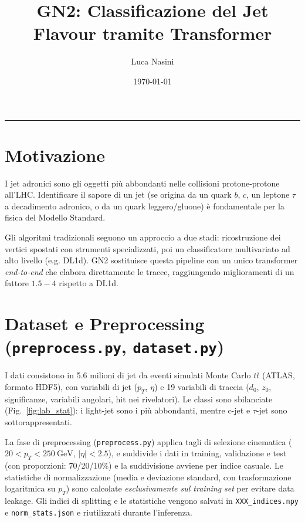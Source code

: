 \documentclass[11pt,a4paper]{article}
\title{\vspace{-1cm}GN2: Classificazione del Jet Flavour tramite Transformer}
\date{\today}
\author{Luca Nasini}
\begin{document}
\maketitle
\vspace{-6pt}
\hrule
\vspace{6pt}


\section{Motivazione}

I jet adronici sono gli oggetti più abbondanti nelle collisioni protone-protone all'LHC.
Identificare il sapore di un jet (se origina da un quark $b$, $c$, un leptone $\tau$ a decadimento adronico, o da un quark leggero/gluone) è fondamentale per la fisica del Modello Standard.

Gli algoritmi tradizionali seguono un approccio a due stadi: ricostruzione dei vertici spostati con strumenti specializzati, poi un classificatore multivariato ad alto livello (e.g. DL1d).
GN2 sostituisce questa pipeline con un unico transformer \textit{end-to-end} che elabora direttamente le tracce, raggiungendo miglioramenti di un fattore $1.5-4$ rispetto a DL1d.

\section{Dataset e Preprocessing (\texttt{preprocess.py}, \texttt{dataset.py})}

I dati consistono in 5.6 milioni di jet da eventi simulati Monte Carlo $t\bar{t}$ (ATLAS, formato HDF5), con variabili di jet ($p_T$, $\eta$) e 19 variabili di traccia ($d_0$, $z_0$, significanze, variabili angolari, hit nei rivelatori).
Le classi sono sbilanciate (Fig.~\ref{fig:lab_stat}): i light-jet sono i più abbondanti, mentre c-jet e $\tau$-jet sono sottorappresentati.

La fase di preprocessing (\texttt{preprocess.py}) applica tagli di selezione cinematica ($20 < p_T < 250~\text{GeV}$, $|\eta| < 2.5$), e suddivide i dati in training, validazione e test (con proporzioni: 70/20/10\%) e la suddivisione avviene per indice casuale.
Le statistiche di normalizzazione (media e deviazione standard, con trasformazione logaritmica su $p_T$) sono calcolate \emph{esclusivamente sul training set} per evitare data leakage.
Gli indici di splitting e le statistiche vengono salvati in \texttt{XXX\_indices.npy} e \texttt{norm\_stats.json} e riutilizzati durante l'inferenza.
\end{document}
